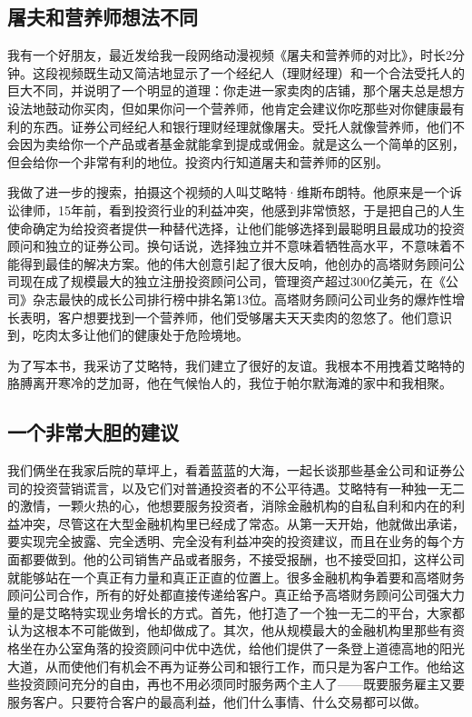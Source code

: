 \subsection{屠夫和营养师想法不同}

我有一个好朋友，最近发给我一段网络动漫视频《屠夫和营养师的对比》，时长2分钟。这段视频既生动又简洁地显示了一个经纪人（理财经理）和一个合法受托人的巨大不同，并说明了一个明显的道理：你走进一家卖肉的店铺，那个屠夫总是想方设法地鼓动你买肉，但如果你问一个营养师，他肯定会建议你吃那些对你健康最有利的东西。证券公司经纪人和银行理财经理就像屠夫。受托人就像营养师，他们不会因为卖给你一个产品或者基金就能拿到提成或佣金。就是这么一个简单的区别，但会给你一个非常有利的地位。投资内行知道屠夫和营养师的区别。

我做了进一步的搜索，拍摄这个视频的人叫艾略特·维斯布朗特。他原来是一个诉讼律师，15年前，看到投资行业的利益冲突，他感到非常愤怒，于是把自己的人生使命确定为给投资者提供一种替代选择，让他们能够选择到最聪明且最成功的投资顾问和独立的证券公司。换句话说，选择独立并不意味着牺牲高水平，不意味着不能得到最佳的解决方案。他的伟大创意引起了很大反响，他创办的高塔财务顾问公司现在成了规模最大的独立注册投资顾问公司，管理资产超过300亿美元，在《公司》杂志最快的成长公司排行榜中排名第13位。高塔财务顾问公司业务的爆炸性增长表明，客户想要找到一个营养师，他们受够屠夫天天卖肉的忽悠了。他们意识到，吃肉太多让他们的健康处于危险境地。

为了写本书，我采访了艾略特，我们建立了很好的友谊。我根本不用拽着艾略特的胳膊离开寒冷的芝加哥，他在气候怡人的，我位于帕尔默海滩的家中和我相聚。

\subsection{一个非常大胆的建议}

我们俩坐在我家后院的草坪上，看着蓝蓝的大海，一起长谈那些基金公司和证券公司的投资营销谎言，以及它们对普通投资者的不公平待遇。艾略特有一种独一无二的激情，一颗火热的心，他想要服务投资者，消除金融机构的自私自利和内在的利益冲突，尽管这在大型金融机构里已经成了常态。从第一天开始，他就做出承诺，要实现完全披露、完全透明、完全没有利益冲突的投资建议，而且在业务的每个方面都要做到。他的公司销售产品或者服务，不接受报酬，也不接受回扣，这样公司就能够站在一个真正有力量和真正正直的位置上。很多金融机构争着要和高塔财务顾问公司合作，所有的好处都直接传递给客户。真正给予高塔财务顾问公司强大力量的是艾略特实现业务增长的方式。首先，他打造了一个独一无二的平台，大家都认为这根本不可能做到，他却做成了。其次，他从规模最大的金融机构里那些有资格坐在办公室角落的投资顾问中优中选优，给他们提供了一条登上道德高地的阳光大道，从而使他们有机会不再为证券公司和银行工作，而只是为客户工作。他给这些投资顾问充分的自由，再也不用必须同时服务两个主人了——既要服务雇主又要服务客户。只要符合客户的最高利益，他们什么事情、什么交易都可以做。

